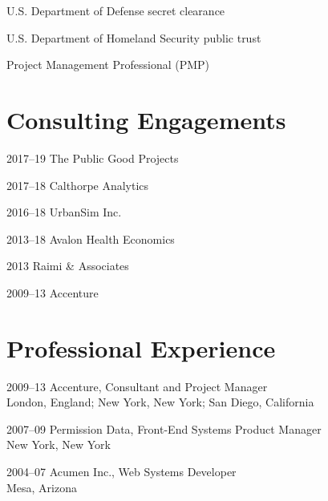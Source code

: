 \documentclass[12pt,letterpaper]{report}
\newcommand{\listitemspace}{0.15em}
\renewenvironment{itemize}
{\begin{list}{}{\setlength{\leftmargin}{0em}
            \setlength{\parskip}{0em}
            \setlength{\itemsep}{\listitemspace}
            \setlength{\parsep}{\listitemspace}}}
    {\end{list}}
\begin{document}
    \begin{itemize}

        \item U.S. Department of Defense secret clearance

        \item U.S. Department of Homeland Security public trust

        \item Project Management Professional (PMP)

    \end{itemize}



    \section*{Consulting Engagements}

    \begin{tablist}

        \item[2017--19] \tab The Public Good Projects

        \item[2017--18] \tab Calthorpe Analytics

        \item[2016--18] \tab UrbanSim Inc.

        \item[2013--18] \tab Avalon Health Economics

        \item[2013]     \tab Raimi \& Associates

        \item[2009--13] \tab Accenture

    \end{tablist}



    \section*{Professional Experience}

    \begin{tablist}

        \item[2009--13] \tab Accenture, Consultant and Project Manager\\
                             London, England; New York, New York; San Diego, California

        \item[2007--09] \tab Permission Data, Front-End Systems Product Manager\\
                             New York, New York

        \item[2004--07] \tab Acumen Inc., Web Systems Developer\\
                             Mesa, Arizona

    \end{tablist}
\end{document}
